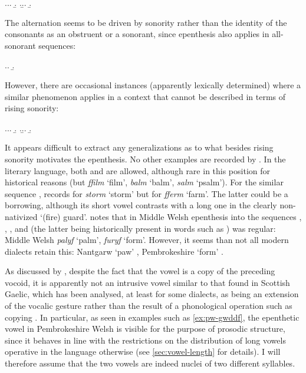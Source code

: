 \ex.\a.\a.
\b.
\z.\b.\a.
\b.

The alternation seems to be driven by sonority rather than the identity of the consonants as an obstruent or a sonorant, since epenthesis also applies in all-sonorant sequences:

\ex.\a.
\b.

However, there are occasional instances (apparently lexically determined) where a similar phenomenon applies in a context that cannot be described in terms of rising sonority:

\ex.\a.\a.
\b.
\z.\b.\label{ex:pw-gwddf}\a.
\b.

It appears difficult to extract any generalizations as to what besides rising sonority motivates the epenthesis. No other examples are recorded by \citet{awbery86:_pembr_welsh}. In the literary language, both \ipa{[ðɡ]} and \ipa{[lm]} are allowed, although rare in this position for historical reasons (but \cf \emph{ffilm} `film', \emph{balm} `balm', \emph{salm} `psalm'). For the similar sequence \ipa{[rm]}, \citet[\emph{sub voce}]{thomas00:_welsh} records \ipa{[ˈstoːrom]} for \emph{storm} `storm' but \ipa{[ˈfarm]} for \emph{fferm} `farm'. The latter could be a borrowing, although its short vowel contrasts with a long one in the clearly non\hyp nativized \ipa{[ˈɡaːrd]} `(fire) guard'. \citet[§4.13]{schumacher11:_mittel_fruhn} notes that in Middle Welsh epenthesis into the sequences \ipa{[lv]}, \ipa{[rv]}, \ipa{[lm]}, \ipa{[rm]} and \ipa{[ðv]} (the latter being historically present in words such as \ipa{[ˈɡuːðuɡ]}) was regular: Middle Welsh \emph{palyf} `palm', \emph{furyf} `form'. However, it seems than not all modern dialects retain this: Nantgarw \ipa{[ˈpalv]} `paw' \citep[\emph{sub voce}]{thomas93:_tafod_nantg}, Pembrokeshire \ipa{[ˈfirv]} `form' \citep[p.~71]{awbery86:_pembr_welsh}.

As discussed by \citet{hannahs09:_welsh}, despite the fact that the vowel is a copy of the preceding vocoid, it is apparently not an intrusive vowel \citep{levin87:_between,hall-intrusion} similar to that found in Scottish Gaelic, which has been analysed, at least for some dialects, as being an extension of the vocalic gesture \citep{hind-epenthesis,bosch-dejong,hall-intrusion} rather than the result of a phonological operation such as copying \citep{clements-barra,smith-gaelic,nevins10:_local}. In particular, as seen in examples such as \ref{ex:pw-gwddf}, the epenthetic vowel in Pembrokeshire Welsh is visible for the purpose of prosodic structure, since it behaves in line with the restrictions on the distribution of long vowels operative in the language otherwise (see \cref{sec:vowel-length} for details). I will therefore assume that the two vowels are indeed nuclei of two different syllables.


